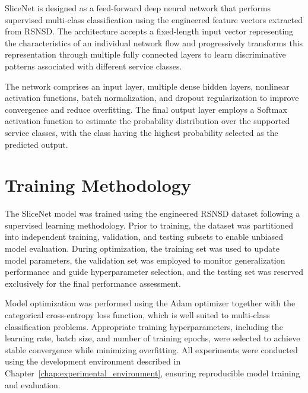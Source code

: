 \documentclass[12pt,a4paper]{report}
\begin{document}
	SliceNet is designed as a feed-forward deep neural network that performs supervised multi-class classification using the engineered feature vectors extracted from RSNSD. The architecture accepts a fixed-length input vector representing the characteristics of an individual network flow and progressively transforms this representation through multiple fully connected layers to learn discriminative patterns associated with different service classes.
	
	The network comprises an input layer, multiple dense hidden layers, nonlinear activation functions, batch normalization, and dropout regularization to improve convergence and reduce overfitting. The final output layer employs a Softmax activation function to estimate the probability distribution over the supported service classes, with the class having the highest probability selected as the predicted output.

	
	\section{Training Methodology}
	\label{sec:training}
	
	The SliceNet model was trained using the engineered RSNSD dataset following a supervised learning methodology. Prior to training, the dataset was partitioned into independent training, validation, and testing subsets to enable unbiased model evaluation. During optimization, the training set was used to update model parameters, the validation set was employed to monitor generalization performance and guide hyperparameter selection, and the testing set was reserved exclusively for the final performance assessment.
	
	Model optimization was performed using the Adam optimizer together with the categorical cross-entropy loss function, which is well suited to multi-class classification problems. Appropriate training hyperparameters, including the learning rate, batch size, and number of training epochs, were selected to achieve stable convergence while minimizing overfitting. All experiments were conducted using the development environment described in Chapter~\ref{chap:experimental_environment}, ensuring reproducible model training and evaluation.
	
\end{document}
